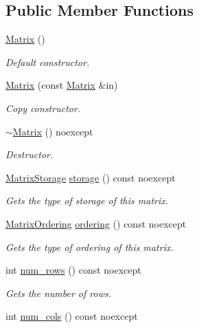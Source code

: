 \subsection*{Public Member Functions}
\begin{DoxyCompactItemize}
\item 
\hyperlink{classmtk_1_1Matrix_a04b8575764d3a649f21950c794f4cc02}{Matrix} ()
\begin{DoxyCompactList}\small\item\em Default constructor. \end{DoxyCompactList}\item 
\hyperlink{classmtk_1_1Matrix_ae532878cf9b34114f12a1f06701482aa}{Matrix} (const \hyperlink{classmtk_1_1Matrix}{Matrix} \&in)
\begin{DoxyCompactList}\small\item\em Copy constructor. \end{DoxyCompactList}\item 
\hyperlink{classmtk_1_1Matrix_a4e8dd5a0654121513421aaf584ef604e}{$\sim$\+Matrix} () noexcept
\begin{DoxyCompactList}\small\item\em Destructor. \end{DoxyCompactList}\item 
\hyperlink{group__c02-enums_ga25b67ec6a2afeee69f9bb196a9c66619}{Matrix\+Storage} \hyperlink{classmtk_1_1Matrix_a9ffaa665a9cf7371b3be568415a08a3b}{storage} () const noexcept
\begin{DoxyCompactList}\small\item\em Gets the type of storage of this matrix. \end{DoxyCompactList}\item 
\hyperlink{group__c02-enums_ga622801bd9f912d0f976c3e383f5f581c}{Matrix\+Ordering} \hyperlink{classmtk_1_1Matrix_a13cd17621652cd5551ff98549bd94df7}{ordering} () const noexcept
\begin{DoxyCompactList}\small\item\em Gets the type of ordering of this matrix. \end{DoxyCompactList}\item 
int \hyperlink{classmtk_1_1Matrix_ab308b25b48e4fcd39fc60e0c3fc66dea}{num\+\_\+rows} () const noexcept
\begin{DoxyCompactList}\small\item\em Gets the number of rows. \end{DoxyCompactList}\item 
int \hyperlink{classmtk_1_1Matrix_a2160118d0edf51cf2aaa806ee1b915f8}{num\+\_\+cols} () const noexcept

\end{DoxyCompactItemize}
